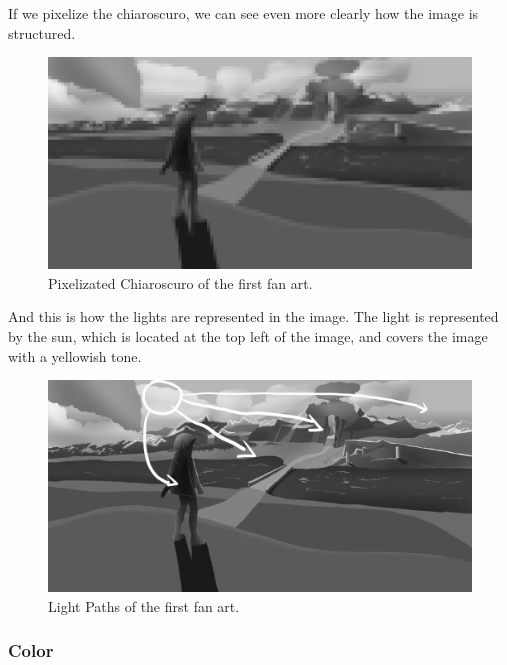 \documentclass{cup-pan}
\begin{document}
            If we pixelize the chiaroscuro, we can see even more clearly how the image is structured.\\
            \begin{figure}[H]
                \includegraphics[width=\textwidth]{Imagenes/Fanart1/Analysis/pixel.png}
                \caption{Pixelizated Chiaroscuro of the first fan art.}
            \end{figure}

            And this is how the lights are represented in the image.
            The light is represented by the sun, which is located at the top left of the image, and covers the image with a yellowish tone.\\
            \begin{figure}[H]
                \includegraphics[width=\textwidth]{Imagenes/Fanart1/Analysis/recorridoluz.png}
                \caption{Light Paths of the first fan art.}
            \end{figure}

        \subsubsection{Color}
\end{document}
